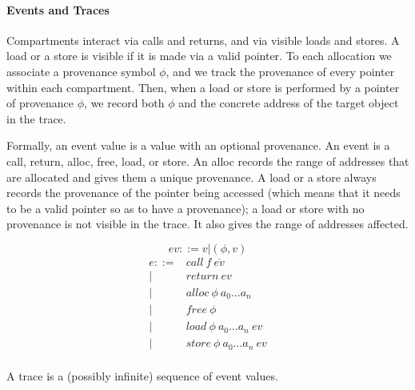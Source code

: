 \documentclass{article}
\begin{document}


\paragraph{Events and Traces}

Compartments interact via calls and returns, and via visible loads and stores. A load or a store
is visible if it is made via a valid pointer. To each allocation we associate a provenance
symbol \(\phi\), and we track the provenance of every pointer within each compartment.
Then, when a load or store is performed by a pointer of provenance \(\phi\), we record both
\(\phi\) and the concrete address of the target object in the trace.

Formally, an event value is a value with an optional provenance. An event is a call, return,
alloc, free, load, or store. An alloc records the range of addresses that are allocated and
gives them a unique provenance. A load or a store always records the provenance of the pointer
being accessed (which means that it needs to be a valid pointer so as to have a provenance);
a load or store with no provenance is not visible in the trace. It also gives the range of
addresses affected.

\[ev ::= v | (\phi, v)\]
\[\begin{split}
e ::= & \mathit{call} ~ f ~ \overline{ev} \\
| & \mathit{return} ~ ev \\
| & \mathit{alloc} ~ \phi ~ a_0 \dots a_n \\
| & \mathit{free} ~ \phi \\
| & \mathit{load} ~ \phi ~ a_0 \dots a_n ~ ev \\
| & \mathit{store} ~ \phi ~ a_0 \dots a_n ~ ev \\
\end{split}\]

A trace is a (possibly infinite) sequence of event values.
\end{document}
